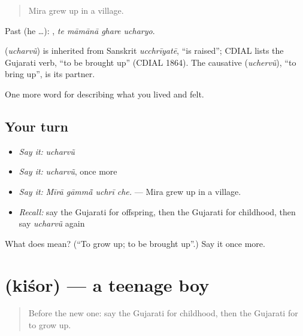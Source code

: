 \begin{quote}
Mira grew up in a village.
\end{quote}

Past (he …):    , \emph{te māmānā ghare ucharyo}.

\begin{cousinweb}
\textbf{} (\emph{ucharvũ}) is inherited from Sanskrit \emph{ucchrīyatē}, \textquotedblleft{}is raised\textquotedblright{}; CDIAL lists the Gujarati verb, \textquotedblleft{}to be brought up\textquotedblright{} (CDIAL 1864). The causative \textbf{} (\emph{uchervũ}), \textquotedblleft{}to bring up\textquotedblright{}, is its partner.
\end{cousinweb}

\begin{grammarlens}[title={What you've built}]
One more word for describing what you lived and felt.
\end{grammarlens}

\subsection*{Your turn}
\begin{itemize}
\raggedright
  \item \emph{Say it:} \emph{ucharvũ}
  \item \emph{Say it:} \emph{ucharvũ}, once more
  \item \emph{Say it:} \emph{Mīrā gāmmā̃ uchrī che.} — Mira grew up in a village.
  \item \emph{Recall:} say the Gujarati for offspring, then the Gujarati for childhood, then say \emph{ucharvũ} again
\end{itemize}

\begin{tcolorbox}[breakable,colback=teal!4,colframe=teal!35!black,title={Before you move on}]
What does  mean? (\textquotedblleft{}To grow up; to be brought up\textquotedblright{}.) Say it once more.
\end{tcolorbox}
\section[\texorpdfstring{\gu{કિશોર} (kiśor)}{કિશોર (kiśor)}]{ (kiśor) — a teenage boy}

\label{lesson:GU-C494-kisor}



\begin{quote}
Before the new one: say the Gujarati for childhood, then the Gujarati for to grow up.
\end{quote}

